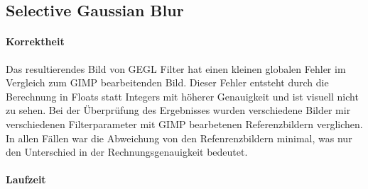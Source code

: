 \documentclass[10pt,a4paper]{article}
\begin{document}





\subsection{Selective Gaussian Blur}
\paragraph{Korrektheit}
Das resultierendes Bild von GEGL Filter hat einen kleinen globalen Fehler im Vergleich zum GIMP bearbeitenden Bild. Dieser Fehler entsteht durch die Berechnung in Floats statt Integers mit höherer Genauigkeit und ist visuell nicht zu sehen. Bei der Überprüfung des Ergebnisses wurden verschiedene Bilder mir verschiedenen Filterparameter mit GIMP bearbetenen Referenzbildern verglichen. In allen Fällen war die Abweichung von den Refenrenzbildern minimal, was nur den Unterschied in der Rechnungsgenauigkeit bedeutet.
\paragraph{Laufzeit}
\end{document}
